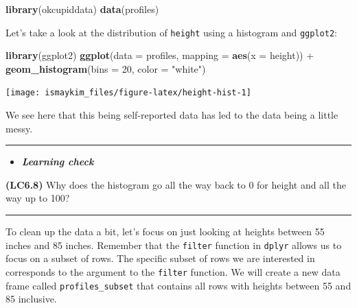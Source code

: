 \documentclass[]{tufte-book}
\newenvironment{Shaded}{\begin{snugshade}}{\end{snugshade}}
\newcommand{\KeywordTok}[1]{\textcolor[rgb]{0.13,0.29,0.53}{\textbf{{#1}}}}
\newcommand{\DataTypeTok}[1]{\textcolor[rgb]{0.13,0.29,0.53}{{#1}}}
\newcommand{\DecValTok}[1]{\textcolor[rgb]{0.00,0.00,0.81}{{#1}}}
\newcommand{\StringTok}[1]{\textcolor[rgb]{0.31,0.60,0.02}{{#1}}}
\newcommand{\NormalTok}[1]{{#1}}
\let\oldrule=\rule
\renewcommand{\rule}[1]{\oldrule{\linewidth}}
\newenvironment{rmdblock}[1]
  {\begin{shaded*}
  \begin{itemize}
  \renewcommand{\labelitemi}{
    \raisebox{-.7\height}[0pt][0pt]{
    }
  }
  \item
  }
  {
  \end{itemize}
  \end{shaded*}
  }
\newenvironment{learncheck}
  {\begin{rmdblock}{warning}}
  {\end{rmdblock}}
\begin{document}
\begin{Shaded}
\begin{Highlighting}[]
\KeywordTok{library}\NormalTok{(okcupiddata)}
\KeywordTok{data}\NormalTok{(profiles)}
\end{Highlighting}
\end{Shaded}

Let's take a look at the distribution of \texttt{height} using a
histogram and \texttt{ggplot2}:

\begin{Shaded}
\begin{Highlighting}[]
\KeywordTok{library}\NormalTok{(ggplot2)}
\KeywordTok{ggplot}\NormalTok{(}\DataTypeTok{data =} \NormalTok{profiles, }\DataTypeTok{mapping =} \KeywordTok{aes}\NormalTok{(}\DataTypeTok{x =} \NormalTok{height)) +}
\StringTok{  }\KeywordTok{geom_histogram}\NormalTok{(}\DataTypeTok{bins =} \DecValTok{20}\NormalTok{, }\DataTypeTok{color =} \StringTok{"white"}\NormalTok{)}
\end{Highlighting}
\end{Shaded}

\begin{center}\texttt{[image: ismaykim\_files/figure-latex/height-hist-1]} \end{center}

We see here that this being self-reported data has led to the data being
a little messy.

\begin{center}\rule{0.5\linewidth}{\linethickness}\end{center}

\begin{learncheck}
\textbf{\emph{Learning check}}
\end{learncheck}

\textbf{(LC6.8)} Why does the histogram go all the way back to 0 for
height and all the way up to 100?

\begin{center}\rule{0.5\linewidth}{\linethickness}\end{center}

To clean up the data a bit, let's focus on just looking at heights
between 55 inches and 85 inches. Remember that the \texttt{filter}
function in \texttt{dplyr} allows us to focus on a subset of rows. The
specific subset of rows we are interested in corresponds to the argument
to the \texttt{filter} function. We will create a new data frame called
\texttt{profiles\_subset} that contains all rows with heights between 55
and 85 inclusive.
\end{document}
